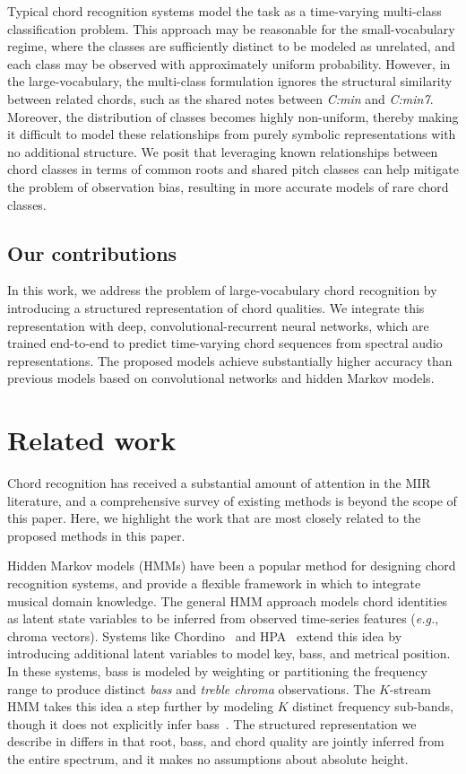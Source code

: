 \documentclass{article}
\def\eg{\emph{e.g.}}
\begin{document}
Typical chord recognition systems model the task as a time-varying multi-class classification problem.
This approach may be reasonable for the small-vocabulary regime, where the classes are sufficiently distinct to be modeled as unrelated, and each class may be observed with approximately uniform probability.
However, in the large-vocabulary, the multi-class formulation ignores the structural similarity between related chords, such as the shared notes between \emph{C:min} and \emph{C:min7}.
Moreover, the distribution of classes becomes highly non-uniform, thereby making it difficult to model these relationships from purely symbolic representations with no additional structure.
We posit that leveraging known relationships between chord classes in terms of common roots and shared pitch classes can help mitigate the problem of observation bias, resulting in more accurate models of rare chord classes.

\subsection{Our contributions}

In this work, we address the problem of large-vocabulary chord recognition by introducing a structured representation of chord qualities.
We integrate this representation with deep, convolutional-recurrent neural networks, which are trained end-to-end to predict time-varying chord sequences from spectral audio representations.
The proposed models achieve substantially higher accuracy than previous models based on convolutional networks and hidden Markov models.

%
\section{Related work}

Chord recognition has received a substantial amount of attention in the MIR literature, and a comprehensive survey of existing methods is beyond the scope of this paper.
Here, we highlight the work that are most closely related to the proposed methods in this paper.

Hidden Markov models (HMMs) have been a popular method for designing chord recognition systems, and provide a flexible framework in which to integrate musical domain knowledge.
The general HMM approach models chord identities as latent state variables to be inferred from observed time-series features (\eg, chroma vectors).
Systems like Chordino~\cite{mauchsimple} and HPA~\cite{ni2012end} extend this idea by introducing additional latent variables to model key, bass, and metrical position.
In these systems, bass is modeled by weighting or partitioning the frequency range to produce distinct \emph{bass} and \emph{treble chroma} observations.
The $K$-stream HMM takes this idea a step further by modeling $K$ distinct frequency sub-bands, though it does not explicitly infer bass~\cite{cho2014improved}.
The structured representation we describe in  differs in that root, bass, and chord quality are jointly inferred from the entire spectrum, and it makes no assumptions about absolute height.
\end{document}
